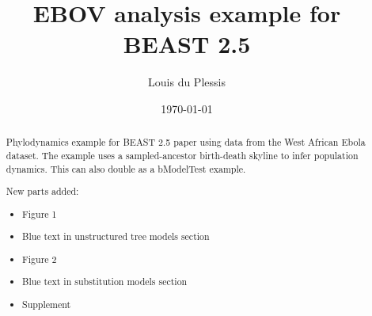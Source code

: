 \documentclass[10pt]{article}
\begin{document}
	\thispagestyle{plain}
	\title{EBOV analysis example for BEAST 2.5}  
	\author{Louis du Plessis}
	\date{\today}
	\maketitle

	
	\begin{abstract}
		Phylodynamics example for BEAST 2.5 paper using data from the West African Ebola dataset. The example uses a sampled-ancestor birth-death skyline to infer population dynamics. This can also double as a bModelTest example.

		\noindent
		New parts added:
		\begin{itemize}
			\item Figure 1
			\item Blue text in unstructured tree models section
			\item Figure 2
			\item Blue text in substitution models section
			\item Supplement
		\end{itemize}
	\end{abstract}

	\tableofcontents

	\clearpage
	

	\clearpage
	\appendix
	\renewcommand{\thefigure}{S\arabic{figure}}
	\renewcommand{\thetable}{S\arabic{table}}	
	\setcounter{page}{1}
	\setcounter{figure}{0}
	

	\clearpage
	\printbibliography
\end{document}

